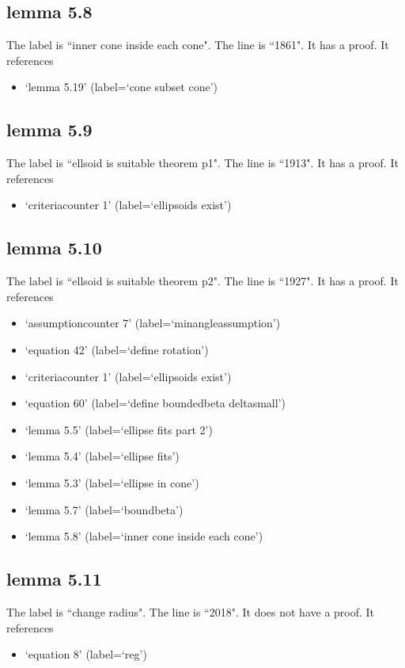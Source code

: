 \documentclass{article}
\begin{document}
\subsection{lemma 5.8}
The label is ``inner cone inside each cone".
The line is ``1861".
It has a proof.
It references \begin{itemize}
\item `lemma 5.19' (label=`cone subset cone')
\end{itemize}
\subsection{lemma 5.9}
The label is ``ellsoid is suitable theorem p1".
The line is ``1913".
It has a proof.
It references \begin{itemize}
\item `criteriacounter 1' (label=`ellipsoids exist')
\end{itemize}
\subsection{lemma 5.10}
The label is ``ellsoid is suitable theorem p2".
The line is ``1927".
It has a proof.
It references \begin{itemize}
\item `assumptioncounter 7' (label=`minangleassumption')
\item `equation 42' (label=`define rotation')
\item `criteriacounter 1' (label=`ellipsoids exist')
\item `equation 60' (label=`define boundedbeta deltasmall')
\item `lemma 5.5' (label=`ellipse fits part 2')
\item `lemma 5.4' (label=`ellipse fits')
\item `lemma 5.3' (label=`ellipse in cone')
\item `lemma 5.7' (label=`boundbeta')
\item `lemma 5.8' (label=`inner cone inside each cone')
\end{itemize}
\subsection{lemma 5.11}
The label is ``change radius".
The line is ``2018".
It does not have a proof.
It references \begin{itemize}
\item `equation 8' (label=`reg')
\end{itemize}
\end{document}

